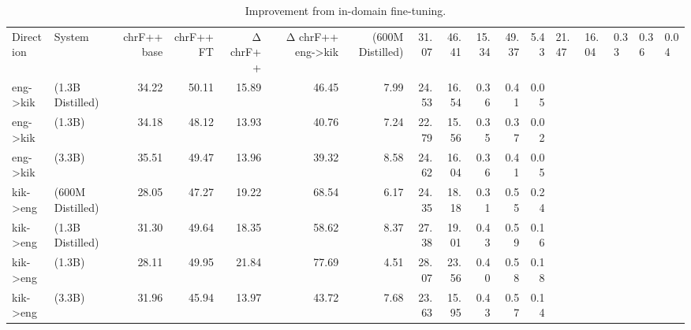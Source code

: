 \begin{table}
\caption{Improvement from in-domain fine-tuning.}
\label{tab:gains}
\begin{tabular}{llrrrrrrrrrr}
\toprule
Direction & System & chrF++ base & chrF++ FT & Δ chrF++ & Δ chrF++ %
\midrule
eng->kik & (600M Distilled) & 31.07 & 46.41 & 15.34 & 49.37 & 5.43 & 21.47 & 16.04 & 0.33 & 0.36 & 0.04 \\
eng->kik & (1.3B Distilled) & 34.22 & 50.11 & 15.89 & 46.45 & 7.99 & 24.53 & 16.54 & 0.36 & 0.41 & 0.05 \\
eng->kik & (1.3B) & 34.18 & 48.12 & 13.93 & 40.76 & 7.24 & 22.79 & 15.56 & 0.35 & 0.37 & 0.02 \\
eng->kik & (3.3B) & 35.51 & 49.47 & 13.96 & 39.32 & 8.58 & 24.62 & 16.04 & 0.36 & 0.41 & 0.05 \\
kik->eng & (600M Distilled) & 28.05 & 47.27 & 19.22 & 68.54 & 6.17 & 24.35 & 18.18 & 0.31 & 0.55 & 0.24 \\
kik->eng & (1.3B Distilled) & 31.30 & 49.64 & 18.35 & 58.62 & 8.37 & 27.38 & 19.01 & 0.43 & 0.59 & 0.16 \\
kik->eng & (1.3B) & 28.11 & 49.95 & 21.84 & 77.69 & 4.51 & 28.07 & 23.56 & 0.40 & 0.58 & 0.18 \\
kik->eng & (3.3B) & 31.96 & 45.94 & 13.97 & 43.72 & 7.68 & 23.63 & 15.95 & 0.43 & 0.57 & 0.14 \\
\bottomrule
\end{tabular}
\end{table}
